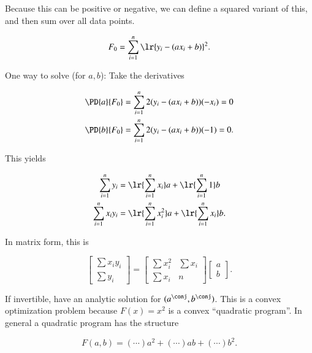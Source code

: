 Because this can be positive or negative, we can define a squared variant of this, and then sum over all data points.

\begin{dmath}\label{eqn:L1introduction:120}
F_0 = \sum_{i=1}^n \lr{ y_i - (a x_i + b) }^2.
\end{dmath}

One way to solve (for \( a, b \)): Take the derivatives

\begin{dmath}\label{eqn:L1introduction:140}
\begin{aligned}
\PD{a}{F_0} &= \sum_{i=1}^n 2 ( y_i - (a x_i + b) )(-x_i) = 0 \\
\PD{b}{F_0} &= \sum_{i=1}^n 2 ( y_i - (a x_i + b) )(-1) = 0.
\end{aligned}
\end{dmath}

This yields

\begin{dmath}\label{eqn:L1introduction:160}
\begin{aligned}
\sum_{i = 1}^n y_i     &= \lr{\sum_{i = 1}^n x_i} a + \lr{\sum_{i = 1}^n 1} b \\
\sum_{i = 1}^n x_i y_i &= \lr{\sum_{i = 1}^n x_i^2} a + \lr{\sum_{i = 1}^n x_i} b.
\end{aligned}
\end{dmath}

In matrix form, this is

\begin{dmath}\label{eqn:L1introduction:180}
\begin{bmatrix}
\sum x_i y_i \\
\sum y_i
\end{bmatrix}
=
\begin{bmatrix}
\sum x_i^2 & \sum x_i \\
\sum x_i & n
\end{bmatrix}
\begin{bmatrix}
a \\
b
\end{bmatrix}.
\end{dmath}

If invertible, have an analytic solution for \( (a^\conj, b^\conj) \).  This is a convex optimization problem because \( F(x) = x^2 \) is a convex ``quadratic program''.  In general a quadratic program has the structure

\begin{dmath}\label{eqn:L1introduction:200}
F(a, b) = (\cdots) a^2 + (\cdots) a b + (\cdots) b^2.
\end{dmath}

